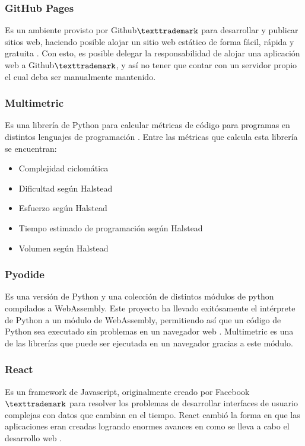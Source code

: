 \documentclass[letterpaper,12pt]{article}
\begin{document}
\subsubsection{GitHub Pages}

Es un ambiente provisto por Github$\texttrademark$ para desarrollar y publicar sitios web, haciendo posible alojar un sitio web estático de forma fácil, rápida y gratuita \cite{Utomo_2020}. Con esto, es posible delegar la responsabilidad de alojar una aplicación web a Github$\texttrademark$, y así no tener que contar con un servidor propio el cual deba ser manualmente mantenido.

\subsubsection{Multimetric}

Es una librería de Python para calcular métricas de código para programas en distintos lenguajes de programación \cite{privkweihmann_multimetric}. Entre las métricas que calcula esta librería se encuentran:

\begin{itemize}
  \item Complejidad ciclomática
  \item Dificultad según Halstead
  \item Esfuerzo según Halstead
  \item Tiempo estimado de programación según Halstead
  \item Volumen según Halstead
\end{itemize}

\subsubsection{Pyodide}

Es una versión de Python y una colección de distintos módulos de python compilados a WebAssembly. Este proyecto ha llevado exitósamente el intérprete de Python a un módulo de WebAssembly, permitiendo así que un código de Python sea executado sin problemas en un navegador web \cite{huffman2023julia}. Multimetric es una de las librerías que puede ser ejecutada en un navegador gracias a este módulo.

\subsubsection{React}

Es un framework de Javascript, originalmente creado por Facebook$\texttrademark$ para resolver los problemas de desarrollar interfaces de usuario complejas con datos que cambian en el tiempo. React cambió la forma en que las aplicaciones eran creadas logrando enormes avances en como se lleva a cabo el desarrollo web \cite{Gackenheimer2015}.
\end{document}
